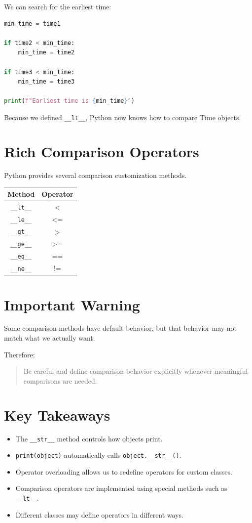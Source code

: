 \documentclass[11pt]{article}
\begin{document}
We can search for the earliest time:

\begin{lstlisting}[language=Python]
min_time = time1

if time2 < min_time:
    min_time = time2

if time3 < min_time:
    min_time = time3

print(f"Earliest time is {min_time}")
\end{lstlisting}

Because we defined \verb|__lt__|, Python now knows how to compare Time objects.

\section{Rich Comparison Operators}

Python provides several comparison customization methods.

\begin{center}
\begin{tabular}{cc}
\toprule
Method & Operator \\
\midrule
\verb|__lt__| & < \\
\verb|__le__| & <= \\
\verb|__gt__| & > \\
\verb|__ge__| & >= \\
\verb|__eq__| & == \\
\verb|__ne__| & != \\
\bottomrule
\end{tabular}
\end{center}

\section{Important Warning}

Some comparison methods have default behavior, but that behavior may not match what we actually want.

Therefore:

\begin{quote}
Be careful and define comparison behavior explicitly whenever meaningful comparisons are needed.
\end{quote}

\section{Key Takeaways}

\begin{itemize}
    \item The \verb|__str__| method controls how objects print.
    \item \verb|print(object)| automatically calls \verb|object.__str__()|.
    \item Operator overloading allows us to redefine operators for custom classes.
    \item Comparison operators are implemented using special methods such as \verb|__lt__|.
    \item Different classes may define operators in different ways.
\end{itemize}
\end{document}
